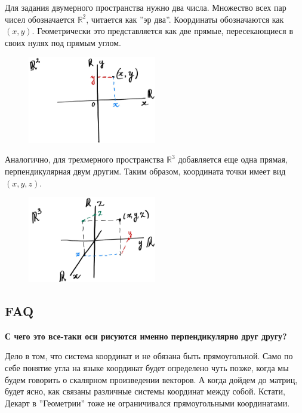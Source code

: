 \documentclass[a4paper,12pt]{article}
\newcommand{\R}{\mathbb{R}}
\newcounter{z-counter}
\newcounter{th-counter}
\begin{document}
Для задания двумерного пространства нужно два числа. Множество всех пар чисел обозначается $\R^2$, читается как ''эр два''. Координаты обозначаются как $(x,y)$. Геометрически это представляется как две прямые, пересекающиеся в своих нулях под прямым углом.

\begin{figure}[h] %
    \centering
    \includegraphics[width=0.5\textwidth]{pictures/two_dimensional_space.jpg}
\end{figure}

Аналогично, для трехмерного пространства $\R^3$ добавляется еще одна прямая, перпендикулярная двум другим. Таким образом, координата точки имеет вид $(x,y,z)$.

\begin{figure}[h] %
    \centering
    \includegraphics[width=0.5\textwidth]{pictures/three_dimensional_space.jpg}
\end{figure}

\subsection*{FAQ}

\textbf{С чего это все-таки оси рисуются именно перпендикулярно друг другу?}

Дело в том, что система координат и не обязана быть прямоугольной. Само по себе понятие угла на языке координат будет определено чуть позже, когда мы будем говорить о скалярном произведении векторов. А когда дойдем до матриц, будет ясно, как связаны различные системы координат между собой. Кстати, Декарт в ''Геометрии'' тоже не ограничивался прямоугольными координатами.
\end{document}
